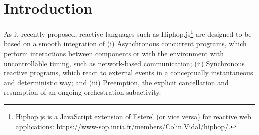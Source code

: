 \documentclass[acmsmall,review,anonymous]{acmart}\settopmatter{printfolios=true,printccs=false,printacmref=false}
\begin{document}



  
  



\maketitle

\section{Introduction}
\label{Introduction}

As it recently proposed,  reactive languages such as Hiphop.js\footnote{Hiphop.js is a JavaScript extension of Esterel \cite{berry1992esterel}
(or vice versa)
for reactive web applications: \url{https://www-sop.inria.fr/members/Colin.Vidal/hiphop/}.}   \cite{vidal2018hiphop,berry2020hiphop} are designed to be
based on a smooth integration of (i) Asynchronous concurrent programs, which perform interactions between components or with the environment with uncontrollable timing, such as network-based communication; (ii) Synchronous reactive programs, which react to external events in a conceptually instantaneous and deterministic way; and (iii) Preemption, the explicit cancellation and resumption of an ongoing orchestration subactivity. 


\end{document}
